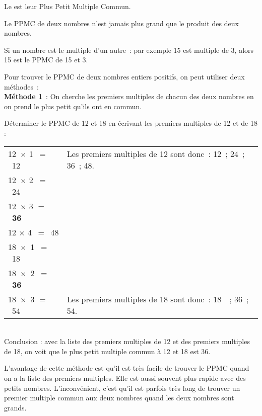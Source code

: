 \begin{methode*1}
 
\begin{aconnaitre}
Le  est leur Plus Petit Multiple Commun.

 \begin{remarque}
Le PPMC de deux nombres n'est jamais plus grand que le produit des deux nombres.

Si un nombre est le multiple d'un autre : par exemple 15 est multiple de 3, alors 15 est le PPMC de 15 et 3.
 \end{remarque}
\end{aconnaitre}

\vspace{0.5cm}

Pour trouver le PPMC de deux nombres entiers positifs, on peut utiliser deux méthodes :  \\[1em]
\textcolor{H1}{\textbf{Méthode 1}} : On cherche les premiers multiples de chacun des deux nombres en on prend le plus petit qu'ils ont en commun.

\begin{exemple*1}
Déterminer le PPMC de 12 et 18 en écrivant les premiers multiples de 12 et de 18 : \\[1em]
 \begin{tabularx}{\textwidth}{l|X}
 \textcolor{A1}{12 $\times$ 1 $=$ 12} & Les premiers multiples de 12 sont donc : 12 ; 24 ; 36 ; 48. \\ 
 \textcolor{A1}{12 $\times$ 2 $=$ 24} &  \\
 \textcolor{A1}{12 $\times$ 3 $=$ \textbf{36}} &  \\
 \textcolor{A1}{12 $\times$ 4 $=$ 48} &  \\ 
 \textcolor{A1}{18 $\times$ 1 $=$ 18} &  \\
 \textcolor{A1}{18 $\times$ 2 $=$ \textbf{36}} &  \\
 \textcolor{A1}{18 $\times$ 3 $=$ 54} & Les premiers multiples de 18 sont donc : 18  ; 36 ; 54. \\
\end{tabularx} \\[1em]
Conclusion : avec la liste des premiers multiples de 12 et des premiers multiples de 18, on voit que le plus petit multiple commun à 12 et 18 est 36. \\[-2em]
 \end{exemple*1}
 
\begin{remarque}
L'avantage de cette méthode est qu'il est très facile de trouver le PPMC quand on a la liste des premiers multiples. Elle est aussi souvent plus rapide avec des petits nombres. L'inconvénient, c'est qu'il est parfois très long de trouver un premier multiple commun aux deux nombres quand les deux nombres sont grands.
 \end{remarque}
 

\end{methode*1}
